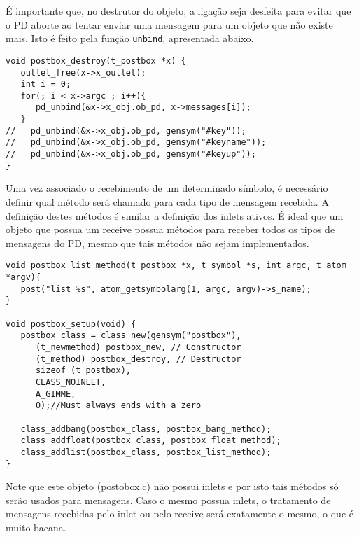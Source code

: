 É importante que, no destrutor do objeto, a ligação seja desfeita para evitar
que o PD aborte ao tentar enviar uma mensagem para um objeto que não existe mais.
Isto é feito pela função \texttt{unbind}, apresentada abaixo.

\begin{lstlisting}[caption=Desvinculando o objeto com a mensagem no destrutor]
void postbox_destroy(t_postbox *x) {
   outlet_free(x->x_outlet);
   int i = 0;
   for(; i < x->argc ; i++){
      pd_unbind(&x->x_obj.ob_pd, x->messages[i]);
   }
//   pd_unbind(&x->x_obj.ob_pd, gensym("#key"));
//   pd_unbind(&x->x_obj.ob_pd, gensym("#keyname"));
//   pd_unbind(&x->x_obj.ob_pd, gensym("#keyup"));
}
\end{lstlisting}


Uma vez associado o recebimento de um determinado símbolo, é necessário definir
qual método será chamado para cada tipo de mensagem recebida.
A definição destes métodos é similar a definição dos inlets ativos.
É ideal que um objeto que possua um receive possua métodos para receber todos
os tipos de mensagens do PD, mesmo que tais métodos não sejam implementados.

\begin{lstlisting}[caption=Associando métodos para receber mensagens]
void postbox_list_method(t_postbox *x, t_symbol *s, int argc, t_atom *argv){
   post("list %s", atom_getsymbolarg(1, argc, argv)->s_name);
}

void postbox_setup(void) {
   postbox_class = class_new(gensym("postbox"),
      (t_newmethod) postbox_new, // Constructor
      (t_method) postbox_destroy, // Destructor
      sizeof (t_postbox),
      CLASS_NOINLET,
      A_GIMME,
      0);//Must always ends with a zero

   class_addbang(postbox_class, postbox_bang_method);
   class_addfloat(postbox_class, postbox_float_method);
   class_addlist(postbox_class, postbox_list_method);
}
\end{lstlisting}

Note que este objeto (postobox.c) não possui inlets e por isto tais métodos
só serão usados para mensagens.
Caso o mesmo possua inlets, o tratamento de mensagens recebidas pelo inlet ou
pelo receive será exatamente o mesmo, o que é muito bacana.


